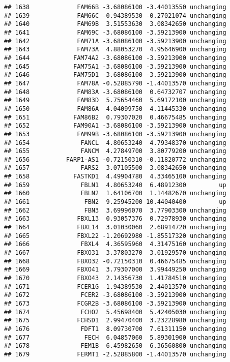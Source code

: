 \documentclass[]{article}
\begin{document}
\begin{verbatim}
## 1638             FAM66B -3.68086100 -3.44013550 unchanging
## 1639             FAM66C -0.94389530 -0.27021074 unchanging
## 1640             FAM69B  3.51553630  3.08342650 unchanging
## 1641             FAM69C -3.68086100 -3.59213900 unchanging
## 1642             FAM71A -3.68086100 -3.59213900 unchanging
## 1643             FAM73A  4.88053270  4.95646900 unchanging
## 1644            FAM74A2 -3.68086100 -3.59213900 unchanging
## 1645            FAM75A1 -3.68086100 -3.59213900 unchanging
## 1646            FAM75D1 -3.68086100 -3.59213900 unchanging
## 1647             FAM78A -0.52885790 -1.44013570 unchanging
## 1648             FAM83A -3.68086100  0.64732707 unchanging
## 1649             FAM83D  5.75654460  5.69172100 unchanging
## 1650             FAM86A  4.04099750  4.11445330 unchanging
## 1651            FAM86B2  0.79307020  0.46675485 unchanging
## 1652            FAM90A1 -3.68086100 -3.59213900 unchanging
## 1653             FAM99B -3.68086100 -3.59213900 unchanging
## 1654              FANCL  4.80653240  4.79348370 unchanging
## 1655              FANCM  4.27849700  3.80779200 unchanging
## 1656          FARP1-AS1 -0.72150310 -0.11820772 unchanging
## 1657              FARS2  3.07105500  3.08342650 unchanging
## 1658            FASTKD1  4.49904780  4.33465100 unchanging
## 1659              FBLN1  4.80653240  6.48912300         up
## 1660              FBLN2  1.64106700  1.14482670 unchanging
## 1661               FBN2  9.25945200 10.44040400         up
## 1662               FBN3  3.69996070  3.77903300 unchanging
## 1663             FBXL13  0.93057376  0.72978930 unchanging
## 1664             FBXL14  3.01030060  2.68914720 unchanging
## 1665             FBXL22 -1.20692980 -1.85517320 unchanging
## 1666              FBXL4  4.36595960  4.31475160 unchanging
## 1667             FBXO31  3.37803270  3.01929570 unchanging
## 1668             FBXO32 -0.72150310  0.46675485 unchanging
## 1669             FBXO41  3.79307000  3.99449250 unchanging
## 1670             FBXO43  2.14356730  1.41784510 unchanging
## 1671             FCER1G -1.94389530 -2.44013570 unchanging
## 1672              FCER2 -3.68086100 -3.59213900 unchanging
## 1673             FCGR2B -3.68086100 -3.59213900 unchanging
## 1674              FCHO2  5.45698400  5.42405030 unchanging
## 1675             FCHSD1  2.99470400  3.23228980 unchanging
## 1676              FDFT1  8.09730700  7.61311150 unchanging
## 1677               FECH  6.04857060  5.89301900 unchanging
## 1678              FEM1B  6.45982650  6.36560800 unchanging
## 1679             FERMT1 -2.52885800 -1.44013570 unchanging

\end{verbatim}
\end{document}
